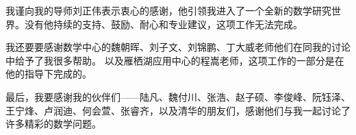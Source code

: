 
\begin{acknowledgements}
  我谨向我的导师刘正伟表示衷心的感谢，他引领我进入了一个全新的数学研究世界。没有他持续的支持、鼓励、耐心和专业建议，这项工作无法完成。

  我还要要感谢数学中心的魏朝晖、刘子文、刘锦鹏、丁大威老师他们在同我的讨论中给予了我很多帮助。
  以及雁栖湖应用中心的程嵩老师，这项工作的一部分是在他的指导下完成的。


  最后，我要感谢我的伙伴们——陆凡、魏付川、张浩、赵子硕、李俊峰、阮钰泽、王宁烽、卢润迪、何会萱、张睿齐，以及清华的朋友们，感谢他们与我一起讨论了许多精彩的数学问题。
\end{acknowledgements}
